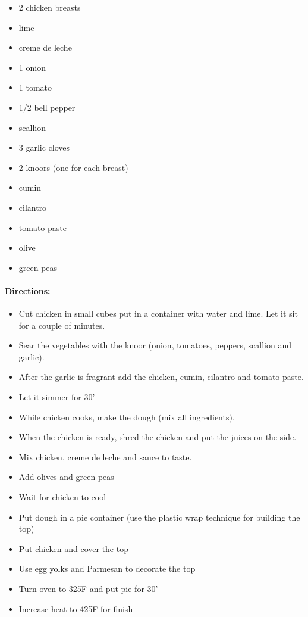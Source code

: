\documentclass{article}
\begin{document}
\begin{itemize}
	\item 2 chicken breasts
	\item lime
	\item creme de leche
	\item 1 onion
	\item 1 tomato
	\item 1/2 bell pepper
	\item scallion
	\item 3 garlic cloves
	\item 2 knoors (one for each breast)
	\item cumin
	\item cilantro
	\item tomato paste
	\item olive
	\item green peas
\end{itemize}

\paragraph{Directions:}
\begin{itemize}
	\item Cut chicken in small cubes put in a container with water and lime. Let it sit for a couple of minutes.
	\item Sear the vegetables with the knoor (onion, tomatoes, peppers, scallion and garlic).
	\item After the garlic is fragrant add the chicken, cumin, cilantro and tomato paste. 
	\item Let it simmer for 30'
	\item While chicken cooks, make the dough (mix all ingredients).
	\item When the chicken is ready, shred the chicken and put the juices on the side.
	\item Mix chicken, creme de leche and sauce to taste. 
	\item Add olives and green peas
	\item Wait for chicken to cool
	\item Put dough in a pie container (use the plastic wrap technique for building the top)
	\item Put chicken and cover the top
	\item Use egg yolks and Parmesan to decorate the top
	\item Turn oven to 325F and put pie for 30'
	\item Increase heat to 425F for finish
\end{itemize}
\end{document}
